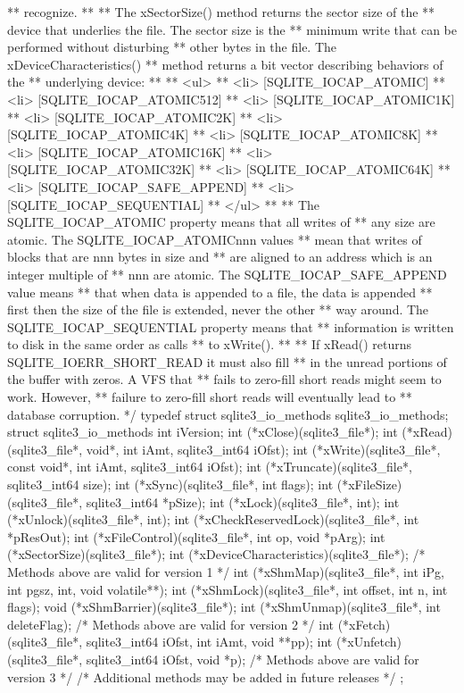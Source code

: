 \begin{Codex}[label=sqlite3.h,numbers=left]
{** recognize.
**
** The xSectorSize() method returns the sector size of the
** device that underlies the file.  The sector size is the
** minimum write that can be performed without disturbing
** other bytes in the file.  The xDeviceCharacteristics()
** method returns a bit vector describing behaviors of the
** underlying device:
**
** <ul>
** <li> [SQLITE_IOCAP_ATOMIC]
** <li> [SQLITE_IOCAP_ATOMIC512]
** <li> [SQLITE_IOCAP_ATOMIC1K]
** <li> [SQLITE_IOCAP_ATOMIC2K]
** <li> [SQLITE_IOCAP_ATOMIC4K]
** <li> [SQLITE_IOCAP_ATOMIC8K]
** <li> [SQLITE_IOCAP_ATOMIC16K]
** <li> [SQLITE_IOCAP_ATOMIC32K]
** <li> [SQLITE_IOCAP_ATOMIC64K]
** <li> [SQLITE_IOCAP_SAFE_APPEND]
** <li> [SQLITE_IOCAP_SEQUENTIAL]
** </ul>
**
** The SQLITE_IOCAP_ATOMIC property means that all writes of
** any size are atomic.  The SQLITE_IOCAP_ATOMICnnn values
** mean that writes of blocks that are nnn bytes in size and
** are aligned to an address which is an integer multiple of
** nnn are atomic.  The SQLITE_IOCAP_SAFE_APPEND value means
** that when data is appended to a file, the data is appended
** first then the size of the file is extended, never the other
** way around.  The SQLITE_IOCAP_SEQUENTIAL property means that
** information is written to disk in the same order as calls
** to xWrite().
**
** If xRead() returns SQLITE_IOERR_SHORT_READ it must also fill
** in the unread portions of the buffer with zeros.  A VFS that
** fails to zero-fill short reads might seem to work.  However,
** failure to zero-fill short reads will eventually lead to
** database corruption.
*/
typedef struct sqlite3_io_methods sqlite3_io_methods;
struct sqlite3_io_methods {
  int iVersion;
  int (*xClose)(sqlite3_file*);
  int (*xRead)(sqlite3_file*, void*, int iAmt, sqlite3_int64 iOfst);
  int (*xWrite)(sqlite3_file*, const void*, int iAmt, sqlite3_int64 iOfst);
  int (*xTruncate)(sqlite3_file*, sqlite3_int64 size);
  int (*xSync)(sqlite3_file*, int flags);
  int (*xFileSize)(sqlite3_file*, sqlite3_int64 *pSize);
  int (*xLock)(sqlite3_file*, int);
  int (*xUnlock)(sqlite3_file*, int);
  int (*xCheckReservedLock)(sqlite3_file*, int *pResOut);
  int (*xFileControl)(sqlite3_file*, int op, void *pArg);
  int (*xSectorSize)(sqlite3_file*);
  int (*xDeviceCharacteristics)(sqlite3_file*);
  /* Methods above are valid for version 1 */
  int (*xShmMap)(sqlite3_file*, int iPg, int pgsz, int, void volatile**);
  int (*xShmLock)(sqlite3_file*, int offset, int n, int flags);
  void (*xShmBarrier)(sqlite3_file*);
  int (*xShmUnmap)(sqlite3_file*, int deleteFlag);
  /* Methods above are valid for version 2 */
  int (*xFetch)(sqlite3_file*, sqlite3_int64 iOfst, int iAmt, void **pp);
  int (*xUnfetch)(sqlite3_file*, sqlite3_int64 iOfst, void *p);
  /* Methods above are valid for version 3 */
  /* Additional methods may be added in future releases */
};

}
\end{Codex}
